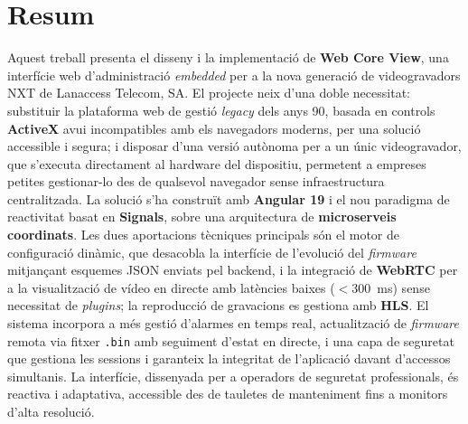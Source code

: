 \documentclass[12pt,a4paper,oneside]{report}
\begin{document}


\chapter*{Resum}
Aquest treball presenta el disseny i la implementació de \textbf{Web Core View}, una interfície web d'administració \textit{embedded} per a la nova generació de videogravadors NXT de Lanaccess Telecom, SA. El projecte neix d'una doble necessitat: substituir la plataforma web de gestió \textit{legacy} dels anys 90, basada en controls \textbf{ActiveX} avui incompatibles amb els navegadors moderns, per una solució accessible i segura; i disposar d'una versió autònoma per a un únic videogravador, que s'executa directament al hardware del dispositiu, permetent a empreses petites gestionar-lo des de qualsevol navegador sense infraestructura centralitzada. La solució s'ha construït amb \textbf{Angular 19} i el nou paradigma de reactivitat basat en \textbf{Signals}, sobre una arquitectura de \textbf{microserveis coordinats}. Les dues aportacions tècniques principals són el motor de configuració dinàmic, que desacobla la interfície de l'evolució del \textit{firmware} mitjançant esquemes JSON enviats pel backend, i la integració de \textbf{WebRTC} per a la visualització de vídeo en directe amb latències baixes ($<$300~ms) sense necessitat de \textit{plugins}; la reproducció de gravacions es gestiona amb \textbf{HLS}. El sistema incorpora a més gestió d'alarmes en temps real, actualització de \textit{firmware} remota via fitxer \texttt{.bin} amb seguiment d'estat en directe, i una capa de seguretat que gestiona les sessions i garanteix la integritat de l'aplicació davant d'accessos simultanis. La interfície, dissenyada per a operadors de seguretat professionals, és reactiva i adaptativa, accessible des de tauletes de manteniment fins a monitors d'alta resolució.
\newpage
\end{document}
